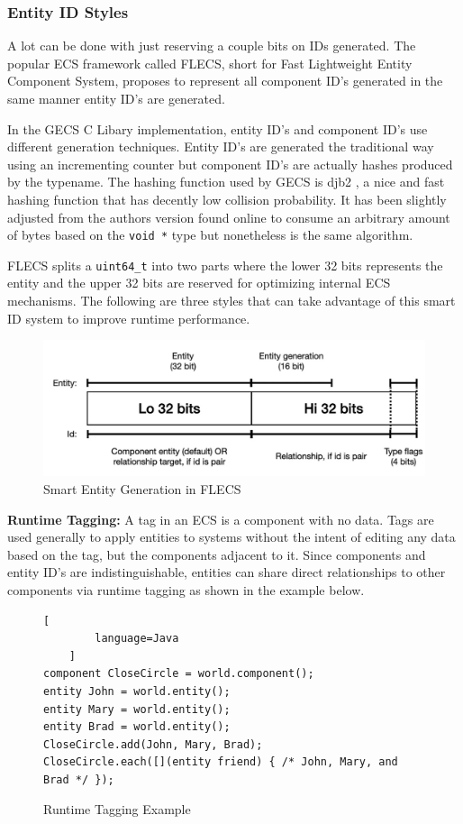 \subsubsection{Entity ID Styles}
A lot can be done with just reserving a couple bits on IDs generated. The popular ECS framework called FLECS, short for Fast Lightweight Entity Component System, proposes to represent all component ID's generated in the same manner entity ID's are generated. 

In the GECS C Libary implementation, entity ID's and component ID's use different generation techniques. Entity ID's are generated the traditional way using an incrementing counter but component ID's are actually hashes produced by the typename. The hashing function used by GECS is djb2 \cite{hashing}, a nice and fast hashing function that has decently low collision probability. It has been slightly adjusted from the authors version found online to consume an arbitrary amount of bytes based on the \texttt{void *} type but nonetheless is the same algorithm. 

FLECS splits a \texttt{uint64\_t} into two parts where the lower 32 bits represents the entity and the upper 32 bits are reserved for optimizing internal ECS mechanisms. The following are three styles that can take advantage of this smart ID system to improve runtime performance.

\begin{figure}[H]
    \centering
    \includegraphics[width=0.5\linewidth]{resources/entity_generation.png}
    \caption{Smart Entity Generation in FLECS}
    \label{fig:entity_generation}
\end{figure}

\textbf{Runtime Tagging:}
A tag in an ECS is a component with no data. Tags are used generally to apply entities to systems without the intent of editing any data based on the tag, but the components adjacent to it. Since components and entity ID's are indistinguishable, entities can share direct relationships to other components via runtime tagging as shown in the example below. \cite{RomeoPHD}

\begin{figure}[H]
    \begin{lstlisting}[
        language=Java
    ]
component CloseCircle = world.component();
entity John = world.entity();
entity Mary = world.entity();
entity Brad = world.entity();
CloseCircle.add(John, Mary, Brad);
CloseCircle.each([](entity friend) { /* John, Mary, and Brad */ });
\end{lstlisting}
    \caption{Runtime Tagging Example}
    \label{code:runtime_tagging}
\end{figure}

